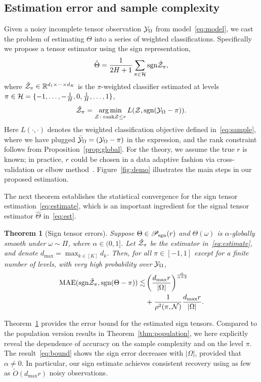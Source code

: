 \documentclass{article}
\theoremstyle{plain}
\newtheorem{thm}{Theorem}
\theoremstyle{definition}
\def\sign{\textup{sgn}}
\def\caliP{\mathscr{P}_{\textup{sgn}}}
\begin{document}
\subsection{Estimation error and sample complexity}

Given a noisy incomplete tensor observation $\mathcal{Y}_\Omega$ from model~\eqref{eq:model}, we cast the problem of estimating $\Theta$ into a series of weighted classifications. Specifically we propose a tensor estimator using the sign representation,
\begin{equation}\label{eq:est}
\hat \Theta = {1\over 2H+1}\sum_{\pi \in \tH}\sign{\hat \tZ_\pi},
\end{equation}
where $\hat {\mathcal{Z}}_\pi\in\mathbb{R}^{d_1\times \dots\times d_K}$ is the $\pi$-weighted classifier estimated at levels $\pi \in \mathcal{H}=\{-1,\ldots,-{1\over H}, 0, {1\over H},\ldots,1\}$,
\begin{equation}\label{eq:estimate}
\hat \tZ_\pi = \argmin_{\tZ\colon \text{rank}\tZ\leq r} L(\tZ, \sign(\tY_\Omega-\pi)).
\end{equation}
Here $L(\cdot,\cdot)$ denotes the weighted classification objective defined in~\eqref{eq:sample}, where we have plugged $\bar {\mathcal{Y}}_\Omega=(\mathcal{Y}_\Omega-\pi)$ in the expression, and the rank constraint follows from Proposition~\ref{prop:global}. For the theory, we assume the true $r$ is known; in practice, $r$ could be chosen in a data adaptive fashion via cross-validation or elbow method~\cite{hastie2009elements}. Figure~\ref{fig:demo} illustrates the main steps in our proposed estimation. 

The next theorem establishes the statistical convergence for the sign tensor estimation~\eqref{eq:estimate}, which is an important ingredient for the signal tensor estimator $\hat \Theta$ in~\eqref{eq:est}. 

 \begin{thm}[Sign tensor errors]\label{thm:classification} Suppose $\Theta\in\caliP(r)$ and $\Theta(\omega)$ is $\alpha$-globally smooth under $\omega\sim \Pi$, where $\alpha\in(0,1]$. Let $\hat {\mathcal{Z}}_\pi$ be the estimator in~\eqref{eq:estimate}, and denote $d_{\max}=\max_{k\in[K]} d_k$. Then, for all $\pi\in[-1,1]$ except for a finite number of levels, with very high probability over $\mathcal{Y}_\Omega$, 
\begin{align}\label{eq:bound}
\textup{MAE}(\sign \hat \tZ_\pi, \sign(\Theta-\pi)) \lesssim & \left({d_{\max} r \over |\Omega|}\right)^{\alpha\over \alpha+2}\notag \\
&+{1 \over \rho^2(\pi, \tN)} {d_{\max}r \over |\Omega|}.
\end{align}
\end{thm}
Theorem~\ref{thm:classification} provides the error bound for the estimated sign tensors. Compared to the population version results in Theorem~\ref{thm:population}, we here explicitly reveal the dependence of accuracy on the sample complexity and on the level $\pi$. The result~\eqref{eq:bound} shows the sign error decreases with $|\Omega|$, provided that $\alpha \neq 0$. In particular, our sign estimate achieves consistent recovery using as few as $\tilde O(d_{\max}r)$ noisy observations. 
\end{document}
